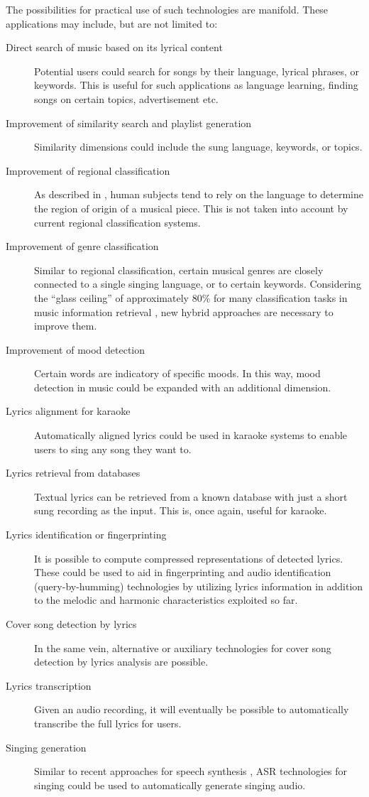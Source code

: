 The possibilities for practical use of such technologies are manifold. These applications may include, but are not limited to:
\begin{description}
\item[Direct search of music based on its lyrical content] Potential users could search for songs by their language, lyrical phrases, or keywords. This is useful for such applications as language learning, finding songs on certain topics, advertisement etc.
\item[Improvement of similarity search and playlist generation] Similarity dimensions could include the sung language, keywords, or topics.
 \item[Improvement of regional classification] As described in \cite{kruspe11}, human subjects tend to rely on the language to determine the region of origin of a musical piece. This is not taken into account by current regional classification systems.
 \item[Improvement of genre classification] Similar to regional classification, certain musical genres are closely connected to a single singing language, or to certain keywords. Considering the ``glass ceiling'' of approximately 80\% for many classification tasks in music information retrieval \cite{glass_ceiling}, new hybrid approaches are necessary to improve them.
 \item[Improvement of mood detection] Certain words are indicatory of specific moods. In this way, mood detection in music could be expanded with an additional dimension.
 \item[Lyrics alignment for karaoke] Automatically aligned lyrics could be used in karaoke systems to enable users to sing any song they want to.
\item[Lyrics retrieval from databases] Textual lyrics can be retrieved from a known database with just a short sung recording as the input. This is, once again, useful for karaoke. 
\item[Lyrics identification or fingerprinting] It is possible to compute compressed representations of detected lyrics. These could be used to aid in fingerprinting and audio identification (query-by-humming) technologies by utilizing lyrics information in addition to the melodic and harmonic characteristics exploited so far. 
\item[Cover song detection by lyrics] In the same vein, alternative or auxiliary technologies for cover song detection by lyrics analysis are possible.
\item[Lyrics transcription] Given an audio recording, it will eventually be possible to automatically transcribe the full lyrics for users.
\item[Singing generation] Similar to recent approaches for speech synthesis \cite{wavenet}, ASR technologies for singing could be used to automatically generate singing audio.
\end{description}



